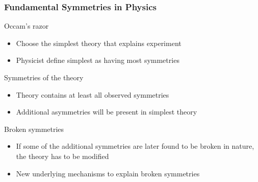 \begin{frame}
 \frametitle{Fundamental Symmetries in Physics}
 \begin{block}{Occam's razor}
  \begin{itemize}
   \item Choose the simplest theory that explains experiment
   \item Physicist define \alert{simplest} as \alert{having most symmetries}
  \end{itemize}
 \end{block}
 \begin{block}{Symmetries of the theory}
  \begin{itemize}
   \item Theory contains at least all observed symmetries
   \item Additional asymmetries will be present in simplest theory
  \end{itemize}
 \end{block}
 \begin{block}{Broken symmetries}
  \begin{itemize}
   \item If some of the additional symmetries are later found to be broken in nature, the theory has to be modified
   \item \alert{New underlying mechanisms} to explain broken symmetries
  \end{itemize}
 \end{block}
\end{frame}
